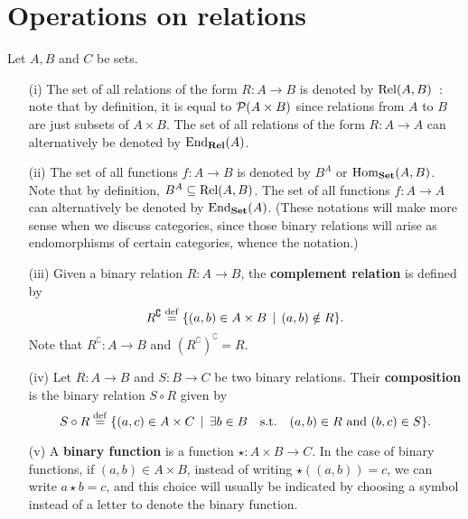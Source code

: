 \section{Operations on relations}

\begin{definition}
	Let $A,B$ and $C$ be sets.
	\begin{itemize}
		\item[(i)] The set of all relations of the form $R : A \to B$ is denoted by $\mathrm{Rel}(A,B)$~: note that by definition, it is equal to $\operatorname{\mathcal P}(A \times B)$ since relations from $A$ to $B$ are just subsets of $A \times B$. The set of all relations of the form $R : A \to A$ can alternatively be denoted by $\operatorname{\mathrm{End}}_{\mathbf{Rel}}(A)$. 
		\\

		\item[(ii)] The set of all functions $f: A \to B$ is denoted by $B^A$ or $\mathrm{Hom}_{\mathbf{Set}}(A,B)$. Note that by definition, $B^A \subseteq \mathrm{Rel}(A,B)$. The set of all functions $f : A \to A$ can alternatively be denoted by $\operatorname{\mathrm{End}}_{\mathbf{Set}}(A)$. (These notations will make more sense when we discuss categories, since those binary relations will arise as endomorphisms of certain categories, whence the notation.)
		\\

		\item[(iii)] Given a binary relation $R: A \to B$, the \textbf{complement relation} is defined by
		\[
			R^{\complement} \overset{\mathrm{def}}{=} \{ (a,b) \in A \times B \, \mid \, (a,b) \notin R \}.
		\]
		Note that $R^{\complement} : A \to B$ and $(R^{\complement})^{\complement} = R$.
		\\

		\item[(iv)] Let $R : A \to B$ and $S: B \to C$ be two binary relations. Their \textbf{composition} is the binary relation $S \circ R$ given by 
		\[
				S \circ R \overset{\mathrm{def}}{=} \{ (a,c) \in A \times C \, \mid \, \exists b \in B \quad \text{s.t.} \quad (a,b) \in R \text{ and } (b,c) \in S \}.
		\]

		\item[(v)] A \textbf{binary function} is a function $\star : A \times B \to C$. In the case of binary functions, if $(a,b) \in A \times B$, instead of writing $\star((a,b)) = c$, we can write $a \star b = c$, and this choice will usually be indicated by choosing a symbol instead of a letter to denote the binary function.
		\\
	\end{itemize}
\end{definition}

